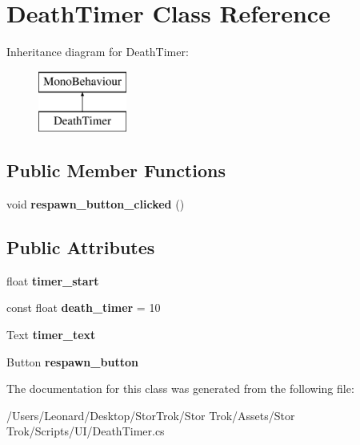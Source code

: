 \hypertarget{class_death_timer}{}\section{Death\+Timer Class Reference}
\label{class_death_timer}
Inheritance diagram for Death\+Timer\+:\begin{figure}[H]
\begin{center}
\leavevmode
\includegraphics[height=2.000000cm]{class_death_timer}
\end{center}
\end{figure}
\subsection*{Public Member Functions}
\begin{DoxyCompactItemize}
\item 
\mbox{\label{class_death_timer_a96dd059f241358fd105e754a065e3416}} 
void {\bfseries respawn\+\_\+button\+\_\+clicked} ()
\end{DoxyCompactItemize}
\subsection*{Public Attributes}
\begin{DoxyCompactItemize}
\item 
\mbox{\label{class_death_timer_a8d538b8a6e2382912768a7d1436a0421}} 
float {\bfseries timer\+\_\+start}
\item 
\mbox{\label{class_death_timer_a5b8900b148c5ff0190b718a158516f7f}} 
const float {\bfseries death\+\_\+timer} = 10
\item 
\mbox{\label{class_death_timer_a9d87e936e7aa4727b020d054cd3dedcb}} 
Text {\bfseries timer\+\_\+text}
\item 
\mbox{\label{class_death_timer_a01d6fc809fe54b19f68d02320c2597ec}} 
Button {\bfseries respawn\+\_\+button}
\end{DoxyCompactItemize}


The documentation for this class was generated from the following file\+:\begin{DoxyCompactItemize}
\item 
/\+Users/\+Leonard/\+Desktop/\+Stor\+Trok/\+Stor Trok/\+Assets/\+Stor Trok/\+Scripts/\+U\+I/Death\+Timer.\+cs\end{DoxyCompactItemize}
